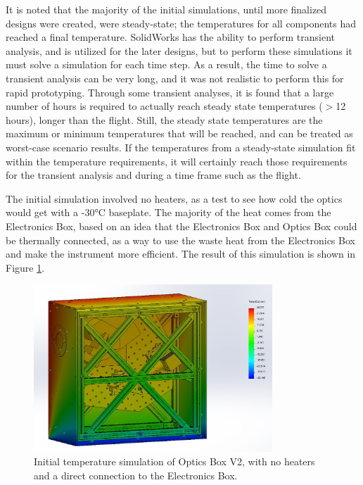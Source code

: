 It is noted that the majority of the initial simulations, until more finalized designs were created, were steady-state; the temperatures for all components had reached a final temperature. SolidWorks has the ability to perform transient analysis, and is utilized for the later designs, but to perform these simulations it must solve a simulation for each time step. As a result, the time to solve a transient analysis can be very long, and it was not realistic to perform this for rapid prototyping. Through some transient analyses, it is found that a large number of hours is required to actually reach steady state temperatures ($>$12 hours), longer than the flight. Still, the steady state temperatures are the maximum or minimum temperatures that will be reached, and can be treated as worst-case scenario results. If the temperatures from a steady-state simulation fit within the temperature requirements, it will certainly reach those requirements for the transient analysis and during a time frame such as the flight.

The initial simulation involved no heaters, as a test to see how cold the optics would get with a -30°C baseplate. The majority of the heat comes from the Electronics Box, based on an idea that the Electronics Box and Optics Box could be thermally connected, as a way to use the waste heat from the Electronics Box and make the instrument more efficient. The result of this simulation is shown in Figure \ref{fig:OB_V2_TA_1}. 

\begin{figure}
    \centering
    \includegraphics[width=0.8\textwidth]{chap3_images/LIFE_V2_images/Thermal_Analysis_25_deg_-30_deg.JPG}
    \caption{Initial temperature simulation of Optics Box V2, with no heaters and a direct connection to the Electronics Box.}
    \label{fig:OB_V2_TA_1}
\end{figure}

